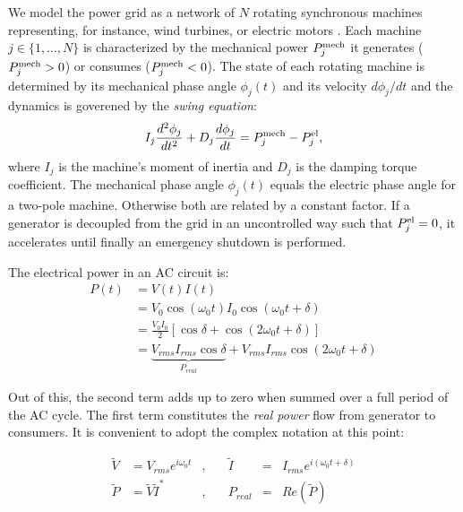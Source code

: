 \documentclass[10pt,aps,pra,twocolumn,superscriptaddress]{revtex4-1}
\newcommand{\be}{\begin{equation}}
\newcommand{\ee}{\end{equation}}
\begin{document}
We model the power grid as a network of $N$ rotating synchronous machines 
\cite[p.~20]{Mach08}
representing, for instance, wind turbines, or electric motors \cite{Prab94,Fila08,12powergrid}. Each machine 
$j \in \{1,\ldots,N\}$
is characterized by the mechanical power $P^{\rm mech}_j$ it 
generates ($P^{\rm mech}_j > 0$) or consumes 
($P^{\rm mech}_j < 0$). The state of each rotating machine is 
determined by its mechanical phase angle $\phi_j(t)$ and 
its velocity $d \phi_j / dt$ and the dynamics is goverened 
by the \emph{swing equation}:
\be
\label{eq-swing}
   I_j \frac{d^2 \phi_j}{dt^2} + D_j \frac{d \phi_j}{dt}
    = P_j^{\rm mech} - P_j^{\rm el},
\ee
where $I_j$ is the machine's moment of inertia and $D_j$
is the damping torque coefficient.  The mechanical phase angle $\phi_j(t)$ 
equals the electric phase angle for a two-pole machine. Otherwise
both are related by a constant factor.
If a generator is decoupled from the grid in an uncontrolled way 
such that $P_j^{\rm el} = 0$, it accelerates until finally an 
emergency shutdown is performed.

The electrical power in an AC circuit is:
\begin{equation}
\label{def-real-power}
\begin{aligned}
P(t)&=V(t)I(t)\\
&=V_{0}\cos{(\omega_0 t)}I_{0}\cos{(\omega_0 t+\delta)}\\
&=\frac{V_{0}I_{0}}{2}\left[\cos{\delta} + \cos{(2\omega_0 t+\delta)} \right]\\
&=\underbrace{V_{rms}I_{rms} \cos{\delta}}_{P_{real}} + V_{rms}I_{rms}\cos{(2\omega_0 t+\delta)}
\end{aligned}
\end{equation}

Out of this, the second term  adds up to zero when summed over a full period of 
the AC cycle. The first term constitutes 
the \emph{real power} flow from generator to consumers. It is convenient to 
adopt the complex notation at this point:

\begin{equation}
\label{}
\begin{aligned}
\tilde{V}&=V_{rms}e^{i\omega_0 t} &,\quad & \tilde{I}&=&I_{rms}e^{i(\omega_0 t+\delta)}\\
\tilde{P}&=\tilde{V}\tilde{I}^* &,\quad & P_{real}&=&Re(\tilde{P})
\end{aligned}
\end{equation}
\end{document}
